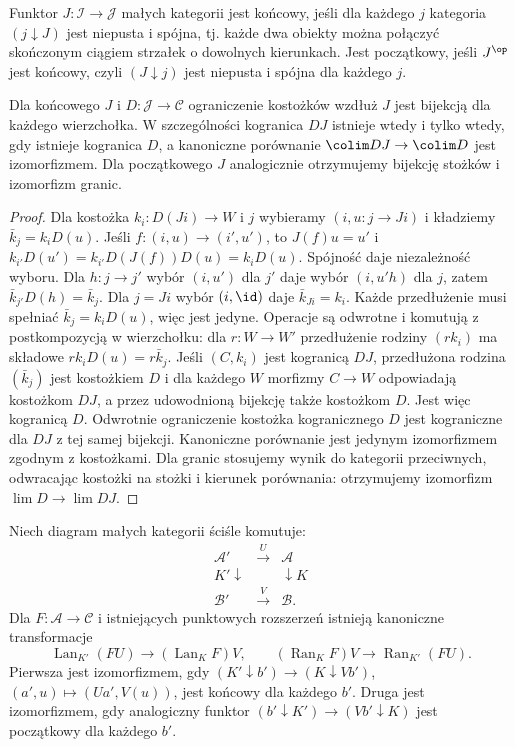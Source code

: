 \begin{definicja}\label{cat:def:kan-final}
Funktor $J:\mathcal I\to\mathcal J$ małych kategorii jest końcowy, jeśli dla każdego $j$ kategoria $(j\downarrow J)$ jest niepusta i spójna, tj. każde dwa obiekty można połączyć skończonym ciągiem strzałek o dowolnych kierunkach. Jest początkowy, jeśli $J^{\op}$ jest końcowy, czyli $(J\downarrow j)$ jest niepusta i spójna dla każdego $j$.
\end{definicja}
\begin{twierdzenie}\label{cat:thm:kan-final-colimits}
Dla końcowego $J$ i $D:\mathcal J\to\mathcal C$ ograniczenie kostożków wzdłuż $J$ jest bijekcją dla każdego wierzchołka. W szczególności kogranica $DJ$ istnieje wtedy i tylko wtedy, gdy istnieje kogranica $D$, a kanoniczne porównanie $\colim DJ\to\colim D$ jest izomorfizmem. Dla początkowego $J$ analogicznie otrzymujemy bijekcję stożków i izomorfizm granic.
\end{twierdzenie}
\begin{proof}
Dla kostożka $k_i:D(Ji)\to W$ i $j$ wybieramy $(i,u:j\to Ji)$ i kładziemy $\bar k_j=k_iD(u)$. Jeśli $f:(i,u)\to(i',u')$, to $J(f)u=u'$ i $k_{i'}D(u')=k_{i'}D(J(f))D(u)=k_iD(u)$. Spójność daje niezależność wyboru. Dla $h:j\to j'$ wybór $(i,u')$ dla $j'$ daje wybór $(i,u'h)$ dla $j$, zatem $\bar k_{j'}D(h)=\bar k_j$. Dla $j=Ji$ wybór $(i,\id)$ daje $\bar k_{Ji}=k_i$. Każde przedłużenie musi spełniać $\bar k_j=k_iD(u)$, więc jest jedyne. Operacje są odwrotne i komutują z postkompozycją w wierzchołku: dla $r:W\to W'$ przedłużenie rodziny $(rk_i)$ ma składowe $rk_iD(u)=r\bar k_j$. Jeśli $(C,k_i)$ jest kogranicą $DJ$, przedłużona rodzina $(\bar k_j)$ jest kostożkiem $D$ i dla każdego $W$ morfizmy $C\to W$ odpowiadają kostożkom $DJ$, a przez udowodnioną bijekcję także kostożkom $D$. Jest więc kogranicą $D$. Odwrotnie ograniczenie kostożka kogranicznego $D$ jest kograniczne dla $DJ$ z tej samej bijekcji. Kanoniczne porównanie jest jedynym izomorfizmem zgodnym z kostożkami. Dla granic stosujemy wynik do kategorii przeciwnych, odwracając kostożki na stożki i kierunek porównania: otrzymujemy izomorfizm $\lim D\to\lim DJ$.
\end{proof}
\begin{wniosek}\label{cat:cor:kan-base-change}
Niech diagram małych kategorii ściśle komutuje:
\[
\begin{array}{ccc}
\mathcal A'&\xrightarrow{U}&\mathcal A\\
K'\downarrow&&\downarrow K\\
\mathcal B'&\xrightarrow{V}&\mathcal B.
\end{array}
\]
Dla $F:\mathcal A\to\mathcal C$ i istniejących punktowych rozszerzeń istnieją kanoniczne transformacje
\[
 \operatorname{Lan}_{K'}(FU)\to(\operatorname{Lan}_K F)V,
 \qquad
 (\operatorname{Ran}_K F)V\to\operatorname{Ran}_{K'}(FU).
\]
Pierwsza jest izomorfizmem, gdy $(K'\downarrow b')\to(K\downarrow Vb')$, $(a',u)\mapsto(Ua',V(u))$, jest końcowy dla każdego $b'$. Druga jest izomorfizmem, gdy analogiczny funktor $(b'\downarrow K')\to(Vb'\downarrow K)$ jest początkowy dla każdego $b'$.
\end{wniosek}
